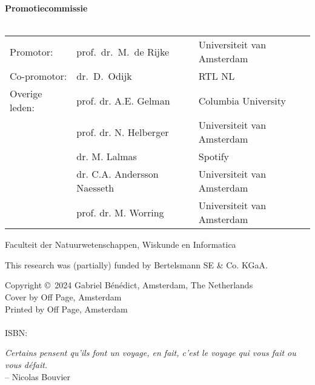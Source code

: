 {%
\clearpage
\noindent%
\textbf{Promotiecommissie} \\\\
\begin{tabular}{@{}l l l}
Promotor: 
& prof.\ dr.\ M.\ de Rijke & Universiteit van Amsterdam \\[0.5ex]  %
Co-promotor: & dr.\ D.\ Odijk & RTL NL \\[1.2ex]  %
Overige leden: 
& prof. dr. A.E. Gelman & Columbia University \\
& prof. dr. N. Helberger  & Universiteit van Amsterdam \\
& dr. M. Lalmas & Spotify \\
& dr. C.A. Andersson Naesseth  & Universiteit van Amsterdam \\
& prof. dr. M. Worring  & Universiteit van Amsterdam 
\end{tabular}

\bigskip\noindent%
Faculteit der Natuurwetenschappen, Wiskunde en Informatica\\

\vfill

\noindent
This research was (partially) funded by Bertelsmann SE \& Co. KGaA.
\bigskip

\noindent
Copyright \copyright~2024 Gabriel Bénédict, Amsterdam, The Netherlands\\		%
Cover by Off Page, Amsterdam\\
Printed by Off Page, Amsterdam\\
\\
ISBN: \todo{}\\


\clearpage






\thispagestyle{empty}
\null\vfill
\centering
\textit{Certains pensent qu'ils font un voyage, en fait, c'est le voyage qui vous fait ou vous défait.} \\ \medskip
\qquad \qquad \qquad \qquad \qquad -- {Nicolas Bouvier}
\vfill\vfill

\clearpage




}

